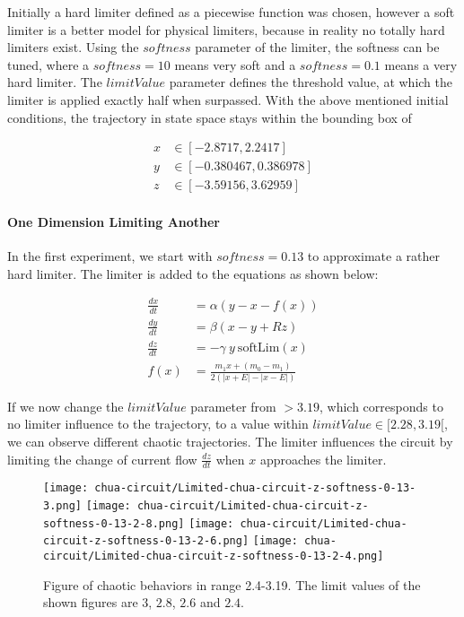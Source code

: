 \documentclass[main]{subfiles}
\begin{document}
Initially a hard limiter defined as a piecewise function was chosen, however a soft limiter is a better model for physical limiters, because in reality no totally hard limiters exist. %
%
Using the $softness$ parameter of the limiter, the softness can be tuned, where a \(softness = 10\) means very soft and a \(softness = 0.1\) means a very hard limiter. %
%
The $limitValue$ parameter defines the threshold value, at which the limiter is applied exactly half when surpassed. %
%
With the above mentioned initial conditions, the trajectory in state space stays within the bounding box of 

\begin{align*}
x &\in [-2.8717,2.2417]\\
y &\in [-0.380467,0.386978]\\
z &\in [-3.59156,3.62959]
\end{align*}

\paragraph{One Dimension Limiting Another}

In the first experiment, we start with \(softness=0.13\) to approximate a rather hard limiter. The limiter is added to the equations as shown below:

\begin{align*}
\frac{dx}{dt}&=\alpha (y-x-f(x)) \\
\frac{dy}{dt}&=\beta (x-y + Rz)\\
\frac{dz}{dt}&=-\gamma ~ y ~ \text{softLim}(x)\\
f (x) &= \frac{m_1 x + (m_0 - m_1)}{2 (| x + E | -| x - E |)}
\end{align*}

If we now change the $limitValue$ parameter from \(>3.19\), which corresponds to no limiter influence to the trajectory, to a value within \(limitValue \in [2.28,3.19[\), we can observe different chaotic trajectories. %
%
The limiter influences the circuit by limiting the change of current flow \(\frac{dz}{dt}\) when \(x\) approaches the limiter.

\begin{figure}[H]
\centering
\texttt{[image: chua-circuit/Limited-chua-circuit-z-softness-0-13-3.png]}
\texttt{[image: chua-circuit/Limited-chua-circuit-z-softness-0-13-2-8.png]}
\texttt{[image: chua-circuit/Limited-chua-circuit-z-softness-0-13-2-6.png]}
\texttt{[image: chua-circuit/Limited-chua-circuit-z-softness-0-13-2-4.png]}
\caption[Figure of chaotic behaviors in range 2.4-3.19]{Figure of chaotic behaviors in range 2.4-3.19. The limit values of the shown figures are \(3\), \(2.8\), \(2.6\) and \(2.4\).}
\label{figure:z-2.4-3.19-chaotictrajectories}
\end{figure}
\end{document}
